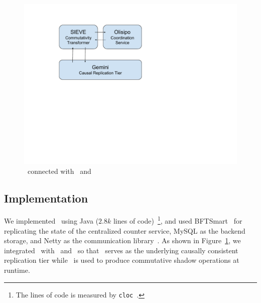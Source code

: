 \begin{figure}[t!]
\centering
\includegraphics[width=0.76\columnwidth]{./figures/tool_intergated.pdf}
\caption{\coordtool\ connected with \tool\ and \gemini}
\label{fig:toolwithenvironment}
\end{figure}

\subsection{Implementation}
We implemented \coordtool\ using Java ($2.8k$ lines of code)~\footnote{The lines of code is
measured by {\tt cloc}~\cite{codecounter}.}, and used BFTSmart~\cite{bftsmartcode} for replicating
the state of the centralized counter service, MySQL as the backend storage, and Netty
as the communication library~\cite{Netty}. As shown in Figure~\ref{fig:toolwithenvironment},
we integrated \coordtool\ with \gemini\ and \tool\ so
that \gemini\ serves as the underlying causally consistent replication tier while \tool\ is used to
produce commutative shadow operations at runtime. 

